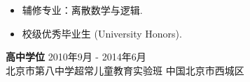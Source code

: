 \documentclass[margin, 10pt]{res} %
\begin{document}
\begin{resume}
\begin{itemize}
\item 辅修专业：离散数学与逻辑.
\item 校级优秀毕业生 (University Honors).
\end{itemize} 

{\bf 高中学位} \hfill 2010年9月 - 2014年6月 \\
北京市第八中学超常儿童教育实验班 \hfill 中国北京市西城区







\end{resume}
\end{document}
